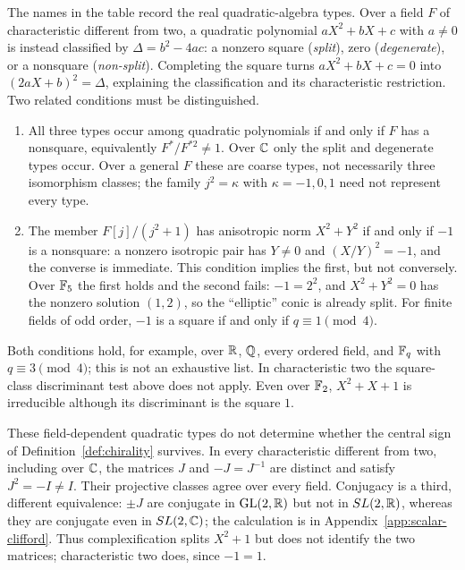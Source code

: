 \begin{remark}
\label{rem:trichotomy-field}
The names in the table record the real quadratic-algebra types.  Over a field $F$
of characteristic different from two, a quadratic polynomial
$aX^{2}+bX+c$ with $a\neq0$ is instead classified by
$\Delta=b^{2}-4ac$: a nonzero square (\emph{split}), zero
(\emph{degenerate}), or a nonsquare (\emph{non-split}).  Completing the square turns
$aX^{2}+bX+c=0$ into $(2aX+b)^{2}=\Delta$, explaining the classification and its characteristic
restriction.  Two related conditions must be distinguished.

\begin{enumerate}
\item All three types occur among quadratic polynomials if and only if $F$ has a
  nonsquare, equivalently $F^{*}/F^{*2}\neq1$.  Over $\mathbb{C}$ only the split and
  degenerate types occur.  Over a general $F$ these are coarse types, not necessarily
  three isomorphism classes; the family $j^{2}=\kappa$ with $\kappa=-1,0,1$ need not
  represent every type.
\item The member $F[j]/(j^{2}+1)$ has anisotropic norm $X^{2}+Y^{2}$ if and only if
  $-1$ is a nonsquare: a nonzero isotropic pair has $Y\neq0$ and
  $(X/Y)^{2}=-1$, and the converse is immediate.  This condition implies the first,
  but not conversely.  Over $\mathbb{F}_{5}$ the first holds and the second fails:
  $-1=2^{2}$, and $X^{2}+Y^{2}=0$ has the nonzero solution $(1,2)$, so the
  ``elliptic'' conic is already split.  For finite fields of odd order, $-1$ is a
  square if and only if $q\equiv1\pmod 4$.
\end{enumerate}

Both conditions hold, for example, over $\mathbb{R}$, $\mathbb{Q}$, every ordered field, and
$\mathbb{F}_q$ with $q\equiv3\pmod4$; this is not an exhaustive list.  In characteristic
two the square-class discriminant test above does not apply.  Even over $\mathbb{F}_2$,
$X^{2}+X+1$ is irreducible although its discriminant is the square $1$.

These field-dependent quadratic types do not determine whether the central sign of
Definition~\ref{def:chirality} survives.  In every characteristic different from two,
including over $\mathbb{C}$, the matrices $J$ and $-J=J^{-1}$ are distinct and satisfy
$J^{2}=-I\neq I$.  Their projective classes agree over every field.  Conjugacy is a
third, different equivalence: $\pm J$ are conjugate in $\operatorname{GL}(2,\mathbb{R})$ but not in
$SL(2,\mathbb{R})$, whereas they are conjugate even in $SL(2,\mathbb{C})$; the calculation is in
Appendix~\ref{app:scalar-clifford}.  Thus complexification splits $X^{2}+1$ but does
not identify the two matrices; characteristic two does, since $-1=1$.
\end{remark}

